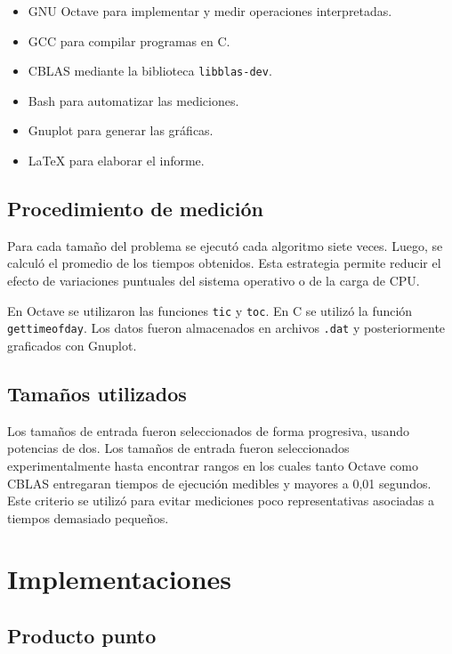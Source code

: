 \documentclass[12pt,letterpaper]{article}
\begin{document}
\begin{itemize}
    \item GNU Octave para implementar y medir operaciones interpretadas.
    \item GCC para compilar programas en C.
    \item CBLAS mediante la biblioteca \texttt{libblas-dev}.
    \item Bash para automatizar las mediciones.
    \item Gnuplot para generar las gráficas.
    \item LaTeX para elaborar el informe.
\end{itemize}

\subsection{Procedimiento de medición}

Para cada tamaño del problema se ejecutó cada algoritmo siete veces. Luego, se calculó el promedio de los tiempos obtenidos. Esta estrategia permite reducir el efecto de variaciones puntuales del sistema operativo o de la carga de CPU.

En Octave se utilizaron las funciones \texttt{tic} y \texttt{toc}. En C se utilizó la función \texttt{gettimeofday}. Los datos fueron almacenados en archivos \texttt{.dat} y posteriormente graficados con Gnuplot.

\subsection{Tamaños utilizados}

Los tamaños de entrada fueron seleccionados de forma progresiva, usando potencias de dos. Los tamaños de entrada fueron seleccionados experimentalmente hasta encontrar rangos en los cuales tanto Octave como CBLAS entregaran tiempos de ejecución medibles y mayores a 0,01 segundos. Este criterio se utilizó para evitar mediciones poco representativas asociadas a tiempos demasiado pequeños.

\section{Implementaciones}

\subsection{Producto punto}
\end{document}
